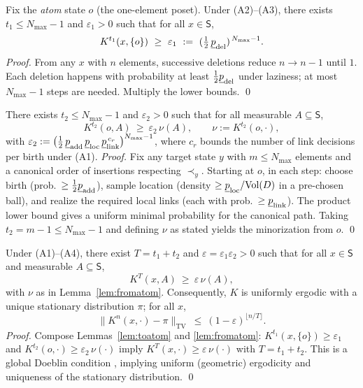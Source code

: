 \begin{lemma}\label{lem:toatom}
Fix the \emph{atom} state $o$ (the one-element poset). Under (A2)--(A3), there exists $t_1\le N_{\max}-1$ and $\varepsilon_1>0$ such that for all $x\in\mathsf{S}$,
\[
K^{t_1}(x,\{o\}) \ \ge\ \varepsilon_1 \ :=\ (\tfrac12\,\underline{p}_{\rm del})^{\,N_{\max}-1}.
\]
\emph{Proof.} From any $x$ with $n$ elements, successive deletions reduce $n\to n-1$ until $1$. Each deletion happens with probability at least $\tfrac12\underline{p}_{\rm del}$ under laziness; at most $N_{\max}-1$ steps are needed. Multiply the lower bounds. \qed
\end{lemma}

\begin{lemma}\label{lem:fromatom}
There exists $t_2\le N_{\max}-1$ and $\varepsilon_2>0$ such that for all measurable $A\subseteq\mathsf{S}$,
\[
K^{t_2}(o,A)\ \ge\ \varepsilon_2\,\nu(A), \qquad \nu:=K^{t_2}(o,\cdot),
\]
with $\varepsilon_2 := \big(\tfrac12\,\underline{p}_{\rm add}\,\underline{p}_{\rm loc}\,\underline{p}_{\rm link}^{\,c_r}\big)^{N_{\max}-1}$, where $c_r$ bounds the number of link decisions per birth under (A1).
\emph{Proof.} Fix any target state $y$ with $m\le N_{\max}$ elements and a canonical order of insertions respecting $\prec_y$. Starting at $o$, in each step: choose birth (prob.\ $\ge\tfrac12\underline{p}_{\rm add}$), sample location (density $\ge \underline{p}_{\rm loc}/\mathrm{Vol}(D)$ in a pre-chosen ball), and realize the required local links (each with prob.\ $\ge\underline{p}_{\rm link}$). The product lower bound gives a uniform minimal probability for the canonical path. Taking $t_2=m-1\le N_{\max}-1$ and defining $\nu$ as stated yields the minorization from $o$. \qed
\end{lemma}

\begin{theorem}\label{thm:doeblin}
Under (A1)--(A4), there exist $T=t_1+t_2$ and $\varepsilon=\varepsilon_1\varepsilon_2>0$ such that for all $x\in\mathsf{S}$ and measurable $A\subseteq \mathsf{S}$,
\[
K^{T}(x,A)\ \ge\ \varepsilon\,\nu(A),
\]
with $\nu$ as in Lemma~\ref{lem:fromatom}. Consequently, $K$ is uniformly ergodic with a unique stationary distribution $\pi$; for all $x$,
\[
\|K^{n}(x,\cdot)-\pi\|_{\mathrm{TV}} \ \le\ (1-\varepsilon)^{\lfloor n/T\rfloor}.
\]
\emph{Proof.} Compose Lemmas~\ref{lem:toatom} and \ref{lem:fromatom}: $K^{t_1}(x,\{o\})\ge \varepsilon_1$ and $K^{t_2}(o,\cdot)\ge \varepsilon_2\,\nu(\cdot)$ imply $K^{T}(x,\cdot)\ge \varepsilon\,\nu(\cdot)$ with $T=t_1+t_2$. This is a global Doeblin condition \cite{Doeblin1937,LevinPeresWilmer2009}, implying uniform (geometric) ergodicity and uniqueness of the stationary distribution. \qed
\end{theorem}

